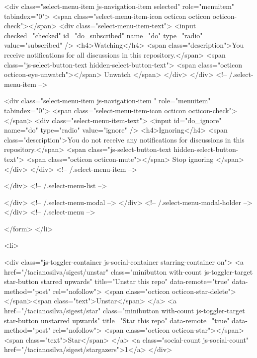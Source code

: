             <div class="select-menu-item js-navigation-item selected" role="menuitem" tabindex="0">
              <span class="select-menu-item-icon octicon octicon octicon-check"></span>
              <div class="select-menu-item-text">
                <input checked="checked" id="do_subscribed" name="do" type="radio" value="subscribed" />
                <h4>Watching</h4>
                <span class="description">You receive notifications for all discussions in this repository.</span>
                <span class="js-select-button-text hidden-select-button-text">
                  <span class="octicon octicon-eye-unwatch"></span>
                  Unwatch
                </span>
              </div>
            </div> <!-- /.select-menu-item -->

            <div class="select-menu-item js-navigation-item " role="menuitem" tabindex="0">
              <span class="select-menu-item-icon octicon octicon-check"></span>
              <div class="select-menu-item-text">
                <input id="do_ignore" name="do" type="radio" value="ignore" />
                <h4>Ignoring</h4>
                <span class="description">You do not receive any notifications for discussions in this repository.</span>
                <span class="js-select-button-text hidden-select-button-text">
                  <span class="octicon octicon-mute"></span>
                  Stop ignoring
                </span>
              </div>
            </div> <!-- /.select-menu-item -->

          </div> <!-- /.select-menu-list -->

        </div> <!-- /.select-menu-modal -->
      </div> <!-- /.select-menu-modal-holder -->
    </div> <!-- /.select-menu -->

</form>
    </li>

  <li>
  
<div class="js-toggler-container js-social-container starring-container on">
  <a href="/tacianosilva/sigest/unstar" class="minibutton with-count js-toggler-target star-button starred upwards" title="Unstar this repo" data-remote="true" data-method="post" rel="nofollow">
    <span class="octicon octicon-star-delete"></span><span class="text">Unstar</span>
  </a>
  <a href="/tacianosilva/sigest/star" class="minibutton with-count js-toggler-target star-button unstarred upwards" title="Star this repo" data-remote="true" data-method="post" rel="nofollow">
    <span class="octicon octicon-star"></span><span class="text">Star</span>
  </a>
  <a class="social-count js-social-count" href="/tacianosilva/sigest/stargazers">1</a>
</div>

